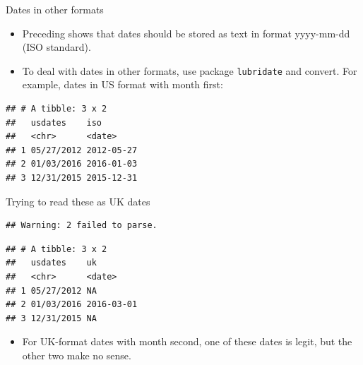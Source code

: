 \documentclass[
  ignorenonframetext,
]{beamer}
\newenvironment{Shaded}{\begin{snugshade}}{\end{snugshade}}
\newcommand{\DataTypeTok}[1]{\textcolor[rgb]{0.13,0.29,0.53}{#1}}
\newcommand{\KeywordTok}[1]{\textcolor[rgb]{0.13,0.29,0.53}{\textbf{#1}}}
\newcommand{\NormalTok}[1]{#1}
\newcommand{\OperatorTok}[1]{\textcolor[rgb]{0.81,0.36,0.00}{\textbf{#1}}}
\newcommand{\StringTok}[1]{\textcolor[rgb]{0.31,0.60,0.02}{#1}}
\providecommand{\tightlist}{%
  \setlength{\itemsep}{0pt}\setlength{\parskip}{0pt}}
\begin{document}
\begin{frame}[fragile]{Dates in other formats}
\protect\hypertarget{dates-in-other-formats}{}

\begin{itemize}
\tightlist
\item
  Preceding shows that dates should be stored as text in format
  yyyy-mm-dd (ISO standard).
\item
  To deal with dates in other formats, use package \texttt{lubridate}
  and convert. For example, dates in US format with month first:
\end{itemize}

\begin{Shaded}
\end{Shaded}

\begin{verbatim}
## # A tibble: 3 x 2
##   usdates    iso       
##   <chr>      <date>    
## 1 05/27/2012 2012-05-27
## 2 01/03/2016 2016-01-03
## 3 12/31/2015 2015-12-31
\end{verbatim}

\end{frame}

\begin{frame}[fragile]{Trying to read these as UK dates}
\protect\hypertarget{trying-to-read-these-as-uk-dates}{}

\begin{Shaded}
\end{Shaded}

\begin{verbatim}
## Warning: 2 failed to parse.
\end{verbatim}

\begin{verbatim}
## # A tibble: 3 x 2
##   usdates    uk        
##   <chr>      <date>    
## 1 05/27/2012 NA        
## 2 01/03/2016 2016-03-01
## 3 12/31/2015 NA
\end{verbatim}

\begin{itemize}
\tightlist
\item
  For UK-format dates with month second, one of these dates is legit,
  but the other two make no sense.
\end{itemize}

\end{frame}
\end{document}
